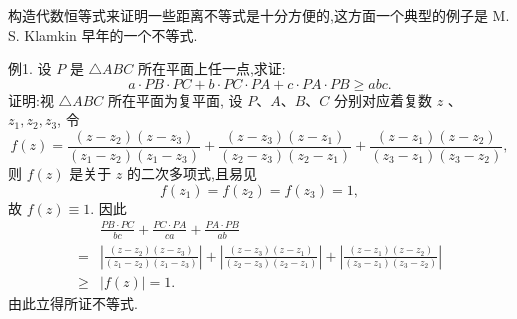 
构造代数恒等式来证明一些距离不等式是十分方便的,这方面一个典型的例子是 M. S. Klamkin 早年的一个不等式.



例1. 设 $P$ 是 $\triangle A B C$ 所在平面上任一点,求证:
$$
a \cdot P B \cdot P C+b \cdot P C \cdot P A+c \cdot P A \cdot P B \geqslant a b c .
$$
证明:视 $\triangle A B C$ 所在平面为复平面, 设 $P 、 A 、 B 、 C$ 分别对应着复数 $z$ 、 $z_1, z_2, z_3$, 令
$$
f(z)=\frac{\left(z-z_2\right)\left(z-z_3\right)}{\left(z_1-z_2\right)\left(z_1-z_3\right)}+\frac{\left(z-z_3\right)\left(z-z_1\right)}{\left(z_2-z_3\right)\left(z_2-z_1\right)}+\frac{\left(z-z_1\right)\left(z-z_2\right)}{\left(z_3-z_1\right)\left(z_3-z_2\right)},
$$
则 $f(z)$ 是关于 $z$ 的二次多项式,且易见
$$
f\left(z_1\right)=f\left(z_2\right)=f\left(z_3\right)=1,
$$
故 $f(z) \equiv 1$. 因此
$$
\begin{aligned}
& \frac{P B \cdot P C}{b c}+\frac{P C \cdot P A}{c a}+\frac{P A \cdot P B}{a b} \\
= & \left|\frac{\left(z-z_2\right)\left(z-z_3\right)}{\left(z_1-z_2\right)\left(z_1-z_3\right)}\right|+\left|\frac{\left(z-z_3\right)\left(z-z_1\right)}{\left(z_2-z_3\right)\left(z_2-z_1\right)}\right|+\left|\frac{\left(z-z_1\right)\left(z-z_2\right)}{\left(z_3-z_1\right)\left(z_3-z_2\right)}\right| \\
\geqslant & |f(z)|=1 .
\end{aligned}
$$
由此立得所证不等式.



